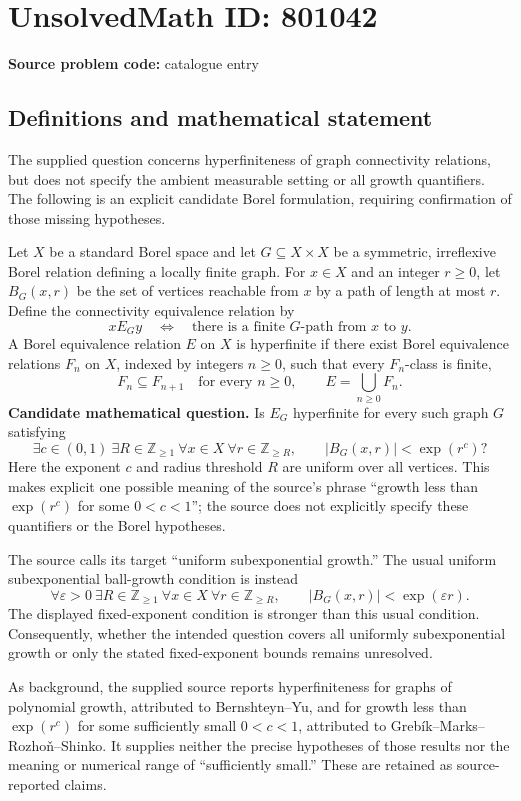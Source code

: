 \documentclass[11pt]{article}
\newcommand{\Z}{\mathbb{Z}}
\begin{document}
\section*{UnsolvedMath ID: 801042}
\textbf{Source problem code:} catalogue entry
\subsection{Definitions and mathematical statement}
The supplied question concerns hyperfiniteness of graph connectivity relations, but does not specify the ambient measurable setting or all growth quantifiers. The following is an explicit candidate Borel formulation, requiring confirmation of those missing hypotheses.

Let \(X\) be a standard Borel space and let \(G\subseteq X\times X\) be a symmetric, irreflexive Borel relation defining a locally finite graph. For \(x\in X\) and an integer \(r\geq 0\), let \(B_G(x,r)\) be the set of vertices reachable from \(x\) by a path of length at most \(r\). Define the connectivity equivalence relation by
\[
x\mathrel{E_G}y\quad\Longleftrightarrow\quad\text{there is a finite }G\text{-path from }x\text{ to }y.
\]
A Borel equivalence relation \(E\) on \(X\) is hyperfinite if there exist Borel equivalence relations \(F_n\) on \(X\), indexed by integers \(n\geq 0\), such that every \(F_n\)-class is finite,
\[
F_n\subseteq F_{n+1}\quad\text{for every }n\geq 0,
\qquad E=\bigcup_{n\geq 0}F_n.
\]
\textbf{Candidate mathematical question.} Is \(E_G\) hyperfinite for every such graph \(G\) satisfying
\[
\exists c\in(0,1)\ \exists R\in\Z_{\geq 1}\ \forall x\in X\ \forall r\in\Z_{\geq R},
\qquad |B_G(x,r)|<\exp(r^c)?
\]
Here the exponent \(c\) and radius threshold \(R\) are uniform over all vertices. This makes explicit one possible meaning of the source's phrase ``growth less than \(\exp(r^c)\) for some \(0<c<1\)''; the source does not explicitly specify these quantifiers or the Borel hypotheses.

The source calls its target ``uniform subexponential growth.'' The usual uniform subexponential ball-growth condition is instead
\[
\forall\varepsilon>0\ \exists R\in\Z_{\geq 1}\ \forall x\in X\ \forall r\in\Z_{\geq R},
\qquad |B_G(x,r)|<\exp(\varepsilon r).
\]
The displayed fixed-exponent condition is stronger than this usual condition. Consequently, whether the intended question covers all uniformly subexponential growth or only the stated fixed-exponent bounds remains unresolved.

As background, the supplied source reports hyperfiniteness for graphs of polynomial growth, attributed to Bernshteyn--Yu, and for growth less than \(\exp(r^c)\) for some sufficiently small \(0<c<1\), attributed to Grebík--Marks--Rozhoň--Shinko. It supplies neither the precise hypotheses of those results nor the meaning or numerical range of ``sufficiently small.'' These are retained as source-reported claims.
\end{document}
